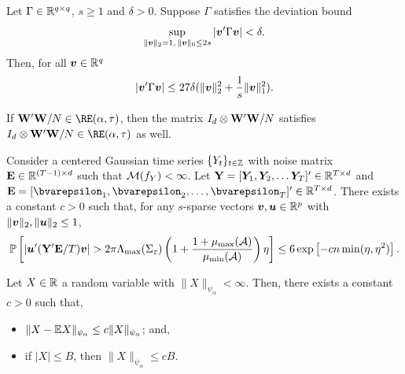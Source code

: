 \begin{lemma}\label{lemma:badRE_to_goodRE}
    Let $\Gamma \in\mathbb{R}^{q\times q}$, $s\geq 1$ and $\delta > 0$. Suppose $\Gamma$ satisfies the deviation bound
    \begin{equation*}
       \sup_{\|\bm{v}\|_2 = 1 ,\, \|\bm{v}\|_0 \leq 2s} |\bm{v}' \Gamma \bm{v}| < \delta .
    \end{equation*}
    Then, for all $\bm{v}\in\mathbb{R}^{q}$
    \begin{equation*}
        |\bm{v}' \Gamma \bm{v}| \leq 27\delta(\|\bm{v}\|_2^2 + \frac{1}{s} \|\bm{v}\|_1^2).
    \end{equation*}
\end{lemma}

\begin{lemma} \label{lemma:re_kronecker}
    If $\Wb'\Wb / N \in \RE(\alpha,\tau)$, then the matrix $I_d \otimes \mathbf{W}'\mathbf{W} / N$ satisfies $I_d \otimes \Wb'\Wb / N \in \RE(\alpha,\tau)$ as well.
\end{lemma}



\begin{lemma}\label{lemma:ts_cov_concentration}
    Consider a centered Gaussian time series $\{Y_t\}_{t\in\mathbb{Z}}$ with noise matrix $\mathbf{E}\in\mathbb{R}^{(T-1) \times d}$ such that $\mathcal{M}(f_{Y}) <\infty$. Let $\mathbf{Y} = [\bm{Y}_1, \bm{Y}_2,\ldots \bm{Y}_T]'\in\mathbb{R}^{T\times d}$ and $\Eb = [\bvarepsilon_1,\bvarepsilon_2,\ldots ,\bvarepsilon_T]'\in\bbR^{T\times d}$.  There exists a constant $c>0$ such that, for any $s$-sparse vectors $\bm{v},\bm{u}\in\mathbb{R}^p$ with $\|\bm{v}\|_2 , \|\bm{u}\|_2 \leq 1$, 
    $$\mathbb{P}\left[ |\bm{u}' (\mathbf{Y}' \mathbf{E} / T ) \bm{v}| > 2\pi \Lambda_{\max}(\Sigma_\varepsilon) \left( 1 + \frac{1 + \mu_{\max}(\mathcal{A})}{\mu_{\min}(\mathcal{A})} \right) \eta \right] \leq 6 \exp\left[ - cn \min(\eta, \eta^2)\right].$$
\end{lemma}



\begin{lemma}
    Let $X\in\mathbb{R}$ a random variable with $\|X\|_{\psi_\alpha} <\infty$. Then,  there exists a constant $c > 0 $ such that,
    \begin{itemize}
        \item $\|X-\mathbb{E} X\|_{\psi_\alpha} \leq c\|X\|_{\psi_\alpha}$; and,
        \item if $|X| \leq B$, then $\|X\|_{\psi_\alpha} \leq c B$.
    \end{itemize}
\end{lemma}

